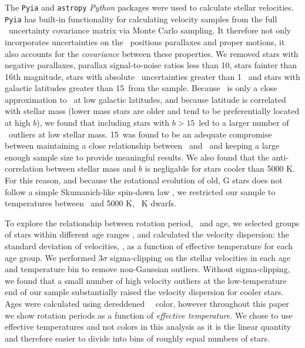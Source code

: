 The {\tt Pyia} \citep{price-whelan_2018} and {\tt astropy} \citep{astropy2013,
astropy2018} {\it Python} packages were used to calculate stellar velocities.
{\tt Pyia} has built-in functionality for calculating velocity samples from
the full \gaia\ uncertainty covariance matrix via Monte Carlo sampling.
It therefore not only incorporates uncertainties on the \gaia\ positions
parallaxes and proper motions, it also accounts for the {\it covariance}
between these properties.
We removed stars with negative parallaxes, parallax signal-to-noise ratios
less than 10, stars fainter than 16th magnitude, stars with absolute \vb\
uncertainties greater than 1 \kms\, and stars with galactic latitudes greater
than 15\degrees\ from the sample.
Because \vb\ is only a close approximation to \vz\ at low galactic latitudes,
and because latitude is correlated with stellar mass (lower mass stars are
older and tend to be preferentially located at high $b$), we found that
including stars with $b > 15$\degrees\ led to a larger number of \vb\ outliers
at low stellar mass.
15\degrees\ was found to be an adequate compromise between maintaining a close
relationship between \vb\ and \vz\ and keeping a large enough sample size to
provide meaningful results.
We also found that the anti-correlation between stellar mass and $b$ is
negligable for stars cooler than 5000 K.
For this reason, and because the rotational evolution of old, G stars does not
follow a simple Skumanich-like spin-down law \citep{vansaders2016}, we
restricted our sample to temperatures between \tmin\ and 5000 K, \ie\ K
dwarfs.

To explore the relationship between rotation period, \teff\ and age, we
selected groups of stars within different age ranges \citep[where age was
calculated using the][gyrochronology relation]{angus2019}, and calculated the
velocity dispersion: the standard deviation of velocities, \sigmavb, as a
function of effective temperature for each age group.
We performed 3$\sigma$ sigma-clipping on the stellar velocities in each age
and temperature bin to remove non-Gaussian outliers.
Without sigma-clipping, we found that a small number of high velocity
outliers at the low-temperature end of our sample substantially raised the
velocity dispersion for cooler stars.
Ages were calculated using dereddened \gaia\ \gcolor\ color, however
throughout this paper we show rotation periods as a function of {\it effective
temperature}.
We chose to use effective temperatures and not colors in this analysis as it
is the linear quantity and therefore easier to divide into bins of roughly
equal numbers of stars.

